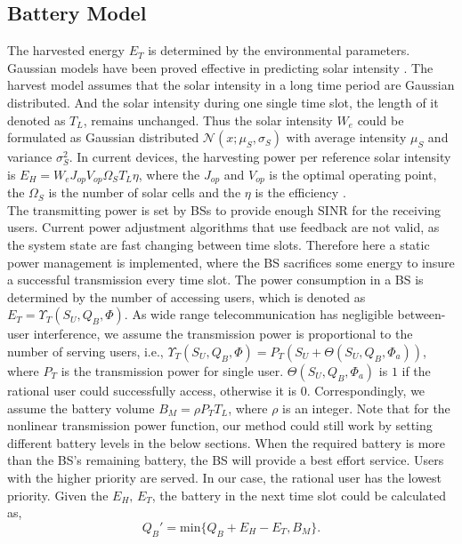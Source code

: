 \documentclass[conference]{IEEEtran}
\begin{document}
\subsection{Battery Model}
The harvested energy \(E_T\) is determined by the environmental parameters.
Gaussian models have been proved effective in predicting solar intensity \cite{gaussian,data}.
The harvest model assumes that the solar intensity in a long time period are Gaussian distributed.
And the solar intensity during one single time slot, the length of it denoted as \(T_L\), remains unchanged.
Thus the solar intensity \(W_e\) could be formulated as
Gaussian distributed \(\mathcal{N}\left(x;\mu_S,\sigma_S\right)\)
with average intensity \(\mu_S\) and variance \(\sigma_S^2\).
In current devices,
the harvesting power per reference solar intensity is
\(E_H = W_eJ_{op}V_{op}\Omega_ST_L\eta\), where the \(J_{op}\) and \(V_{op}\) is the optimal operating point,
the \(\Omega_S\) is the number of solar cells and the \(\eta\) is the efficiency \cite{physic}.\\
\indent The transmitting power is set by BSs to provide enough SINR for the receiving users.
Current power adjustment algorithms that use feedback are not valid,
as the system state are fast changing between time slots.
Therefore here a static power management is implemented,
where the BS sacrifices some energy to insure a successful transmission every time slot.
The power consumption in a BS is determined by the number of accessing users,
which is denoted as \(E_T = \Upsilon_T(S_U, Q_B, \Phi)\).
As wide range telecommunication has negligible between-user interference,
we assume the transmission power is proportional to the number of serving users, i.e.,
\(\Upsilon_T(S_U, Q_B, \Phi) = P_T(S_U + \Theta(S_U,Q_B,\Phi_a))\), where \(P_T\) is the transmission power for single user.
\(\Theta(S_U,Q_B,\Phi_a)\) is \(1\) if the rational user could successfully access, otherwise it is \(0\).
Correspondingly, we assume the battery volume \(B_M = \rho P_TT_L\), where \(\rho\) is an integer.
Note that for the nonlinear transmission power function,
our method could still work by setting different battery levels in the below sections.
When the required battery is more than the BS's remaining battery,
the BS will provide a best effort service.
Users with the higher priority are served.
In our case, the rational user has the lowest priority.
Given the \(E_H,\,E_T\), the battery in the next time slot could be calculated as,
\begin{equation}
	Q_B' = \mbox{min}\{Q_B + E_H - E_T, B_M\}.
\end{equation}
\end{document}
